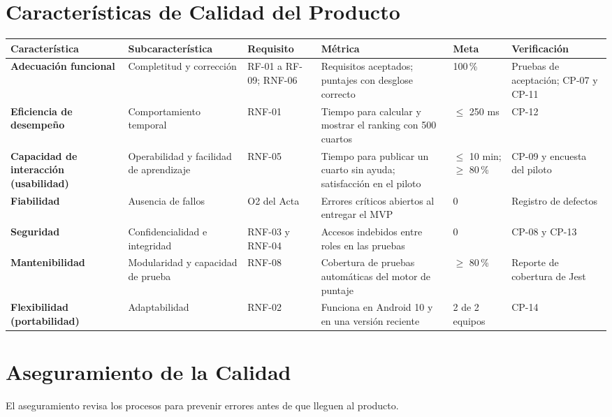 \documentclass[11pt,a4paper]{article}
\begin{document}
\section{Características de Calidad del Producto}
{\footnotesize
\setlength{\tabcolsep}{3pt}
\noindent\begin{tabularx}{\textwidth}{@{}P{2.35cm} P{2.45cm} P{1.6cm} L C{1.45cm} P{2.25cm}@{}}
\toprule
{}
\textbf{Característica} & \textbf{Subcaracte\-rística} & \textbf{Requisito} & \textbf{Métrica} & \textbf{Meta} & \textbf{Verificación} \\
\midrule
\textbf{Adecuación funcional} & Completitud y corrección & RF-01 a RF-09; RNF-06 & Requisitos aceptados; puntajes con desglose correcto & 100\,\% & Pruebas de aceptación; CP-07 y CP-11 \\
\textbf{Eficiencia de desempeño} & Comportamiento temporal & RNF-01 & Tiempo para calcular y mostrar el ranking con 500 cuartos & $\le$ 250 ms & CP-12 \\
\textbf{Capacidad de interacción (usabilidad)} & Operabilidad y facilidad de aprendizaje & RNF-05 & Tiempo para publicar un cuarto sin ayuda; satisfacción en el piloto & $\le$ 10 min; $\ge$ 80\,\% & CP-09 y encuesta del piloto \\
\textbf{Fiabilidad} & Ausencia de fallos & O2 del Acta & Errores críticos abiertos al entregar el MVP & 0 & Registro de defectos \\
\textbf{Seguridad} & Confidencialidad e integridad & RNF-03 y RNF-04 & Accesos indebidos entre roles en las pruebas & 0 & CP-08 y CP-13 \\
\textbf{Mantenibilidad} & Modularidad y capacidad de prueba & RNF-08 & Cobertura de pruebas automáticas del motor de puntaje & $\ge$ 80\,\% & Reporte de cobertura de Jest \\
\textbf{Flexibilidad (portabilidad)} & Adaptabilidad & RNF-02 & Funciona en Android 10 y en una versión reciente & 2 de 2 equipos & CP-14 \\
\bottomrule
\end{tabularx}
}

\section{Aseguramiento de la Calidad}
El aseguramiento revisa los procesos para prevenir errores antes de que lleguen al producto.
\end{document}
